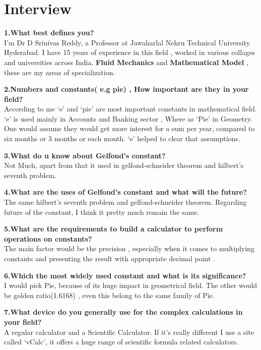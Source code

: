 \documentclass[12pt]{article}
\begin{document}
\section{\centering Interview}
\begin{justify}
\textbf{1.What best defines you?}\\
 I’m Dr D Srinivas Reddy, a Professor at Jawaharlal Nehru Technical University Hyderabad. I have 15 years of experience in this field , worked in various collages and universities across India. \textbf{Fluid Mechanics} and \textbf{Mathematical Model} , these are my areas of specialization.
 
\noindent \textbf{2.Numbers and constants( e.g pie) , How important are they in your field?}\\
According to me ‘e’ and ‘pie’ are most important constants in mathematical field.
‘e’ is used mainly in Accounts and Banking sector , Where as ‘Pie’ in Geometry. One would assume they would get more interest for a sum per year, compared to six months or 3 months or each month. ‘e’ helped to clear that assumptions.

\noindent \textbf{3.What do u know about Gelfond's constant?}\\
Not Much, apart from that it used in gelfond-schneider theorem and hilbert's seventh problem.

\noindent \textbf{4.What are the uses of Gelfond's constant and what will the future?}\\
The same hilbert's seventh problem and gelfond-schneider theorem. Regarding future of the constant, I think it pretty much remain the same.

\noindent \textbf{5.What are the requirements to build a calculator to perform operations on  constants?}\\
The main factor would be the precision , especially when it comes to multiplying constants and presenting the result with appropriate decimal point .

\noindent \textbf{6.Which the most widely used constant and what is its  significance?}\\
I would pick Pie, because of its huge impact in geometrical field. The other would be golden ratio(1.6168) , even this belong to the same family of Pie.

\noindent \textbf{7.What device do you generally use for the complex calculations in your field?}\\
A regular calculator and a Scientific Calculator. If it's really different I use a site called  ‘vCalc’, it offers a huge range of scientific formula related calculators.


\end{justify}
\end{document}
